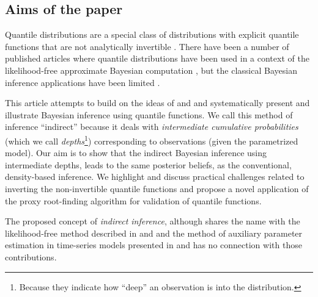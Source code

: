 \documentclass[
  12pt,
]{article}
\begin{document}
\hypertarget{aims-of-the-paper}{%
\subsection{Aims of the paper}\label{aims-of-the-paper}}

Quantile distributions are a special class of distributions with explicit quantile functions that are not analytically invertible \citep{gilchrist2000StatisticalModellingQuantile}. There have been a number of published articles where quantile distributions have been used in a context of the likelihood-free approximate Bayesian computation \citep{allingham2009BayesianEstimationQuantile, drovandi2011LikelihoodfreeBayesianEstimation, karabatsos2018ApproximateLikelihoodPerspective, fearnhead2012ConstructingSummaryStatistics, bernton2019ApproximateBayesianComputation, mcvinish2012ImprovingABCQuantile}, but the classical Bayesian inference applications have been limited \citep{haynes2005BayesianEstimationGandk, rayner2002NumericalMaximumLikelihood}.

This article attempts to build on the ideas of \citet{rayner2002NumericalMaximumLikelihood} and \citet{nair2020BayesianInferenceQuantile} and systematically present and illustrate Bayesian inference using quantile functions. We call this method of inference ``indirect'' because it deals with \emph{intermediate cumulative probabilities} (which we call \emph{depths}\footnote{Because they indicate how ``deep'' an observation is into the distribution.}) corresponding to observations (given the parametrized model). Our aim is to show that the indirect Bayesian inference using intermediate depths, leads to the same posterior beliefs, as the conventional, density-based inference. We highlight and discuss practical challenges related to inverting the non-invertible quantile functions and propose a novel application of the proxy root-finding algorithm for validation of quantile functions.

The proposed concept of \emph{indirect inference}, although shares the name with the likelihood-free method described in \citet{heggland2004EstimatingFunctionsIndirect} and \citet{drovandi2011LikelihoodfreeBayesianEstimation} and the method of auxiliary parameter estimation in time-series models presented in \citet{smithjr.1993EstimatingNonlinearTimeseries} and \citet{gourieroux1993IndirectInference} has no connection with those contributions.
\end{document}
